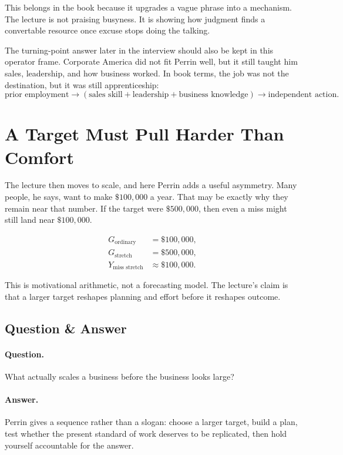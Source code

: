 \documentclass[11pt,oneside]{book}
\begin{document}
This belongs in the book because it upgrades a vague phrase into a mechanism. The lecture is not praising busyness. It is showing how judgment finds a convertable resource once excuse stops doing the talking.

The turning-point answer later in the interview should also be kept in this operator frame. Corporate America did not fit Perrin well, but it still taught him sales, leadership, and how business worked. In book terms, the job was not the destination, but it was still apprenticeship:
\begin{equation}
\text{prior employment}
\to
(\text{sales skill}+\text{leadership}+\text{business knowledge})
\to
\text{independent action}.
\end{equation}

\section{A Target Must Pull Harder Than Comfort}

The lecture then moves to scale, and here Perrin adds a useful asymmetry. Many people, he says, want to make \(\$100{,}000\) a year. That may be exactly why they remain near that number. If the target were \(\$500{,}000\), then even a miss might still land near \(\$100{,}000\).

\begin{align}
G_{\text{ordinary}} &= \$100{,}000,\\
G_{\text{stretch}} &= \$500{,}000,\\
Y_{\text{miss stretch}} &\approx \$100{,}000.
\end{align}

\begin{remark}
This is motivational arithmetic, not a forecasting model. The lecture's claim is that a larger target reshapes planning and effort before it reshapes outcome.
\end{remark}

\subsection{Question \& Answer}

\paragraph{Question.}
What actually scales a business before the business looks large?

\paragraph{Answer.}
Perrin gives a sequence rather than a slogan: choose a larger target, build a plan, test whether the present standard of work deserves to be replicated, then hold yourself accountable for the answer.
\end{document}

